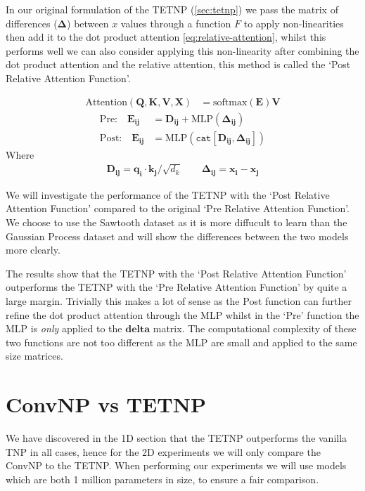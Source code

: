 \documentclass[../../main.tex]{subfiles}
\begin{document}

In our original formulation of the TETNP (\autoref{sec:tetnp}) we pass the matrix of differences ($\bm{\Delta}$) between $x$ values through a function $F$ to apply non-linearities then add it to the dot product attention \autoref{eq:relative-attention}, whilst this performs well we can also consider applying this non-linearity after combining the dot product attention and the relative attention, this method is called the `Post Relative Attention Function'. 

\begin{align}
	\text{Attention}(\bm{Q}, \bm{K}, \bm{V}, \bm{X}) &= \text{softmax}\left(\bm{E} \right) \bm{V}
\end{align}
\begin{align}
	\text{Pre:} \quad \bm{E_{ij}} &= \bm{D_{ij}}+ \text{MLP}(\bm{\Delta_{ij}})\\
    \text{Post:} \quad \bm{E_{ij}} &= \text{MLP}(\texttt{cat}[ \bm{D_{ij}}, \bm{\Delta_{ij}}])
\end{align}
Where 
\begin{align}
     \bm{D_{ij}} = \bm{q_i} \cdot \bm{k_j}  /\sqrt{d_k} \quad \quad    \bm{\Delta_{ij}} = \bm{x_i} - \bm{x_j}
\end{align}


We will investigate the performance of the TETNP with the `Post Relative Attention Function' compared to the original `Pre Relative Attention Function'. We choose to use the Sawtooth dataset as it is more diffucult to learn than the Gaussian Process dataset and will show the differences between the two models more clearly. 



The results show that the TETNP with the `Post Relative Attention Function' outperforms the TETNP with the `Pre Relative Attention Function' by quite a large margin. Trivially this makes a lot of sense as the Post function can further refine the dot product attention through the MLP whilst in the `Pre' function the MLP is \emph{only} applied to the $\bm{delta}$ matrix. The computational complexity of these two functions are not too different as the MLP are small and applied to the same size matrices. 


\section{ConvNP vs TETNP}

We have discovered in the 1D section that the TETNP outperforms the vanilla TNP in all cases, hence for the 2D experiments we will only compare the ConvNP to the TETNP. When performing our experiments we will use models which are both 1 million parameters in size, to ensure a fair comparison.
\end{document}
